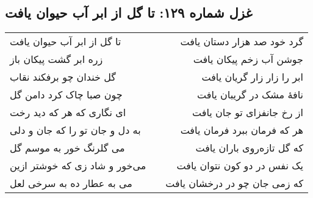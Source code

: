\begin{center}
\section*{غزل شماره ۱۲۹: تا گل از ابر آب حیوان یافت}
\label{sec:129}
\begin{longtable}{l p{0.5cm} r}
تا گل از ابر آب حیوان یافت
&&
گرد خود صد هزار دستان یافت
\\
زره ابر گشت پیکان باز
&&
جوشن آب زخم پیکان یافت
\\
گل خندان چو برفکند نقاب
&&
ابر را زار زار گریان یافت
\\
چون صبا چاک کرد دامن گل
&&
نافهٔ مشک در گریبان یافت
\\
ای نگاری که هر که دید رخت
&&
از رخ جانفزای تو جان یافت
\\
به دل و جان تو را که جان و دلی
&&
هر که فرمان ببرد فرمان یافت
\\
می گلرنگ خور به موسم گل
&&
که گل تازه‌روی باران یافت
\\
می‌خور و شاد زی که خوشتر ازین
&&
یک نفس در دو کون نتوان یافت
\\
می به عطار ده به سرخی لعل
&&
که زمی جان چو در درخشان یافت
\\
\end{longtable}
\end{center}
